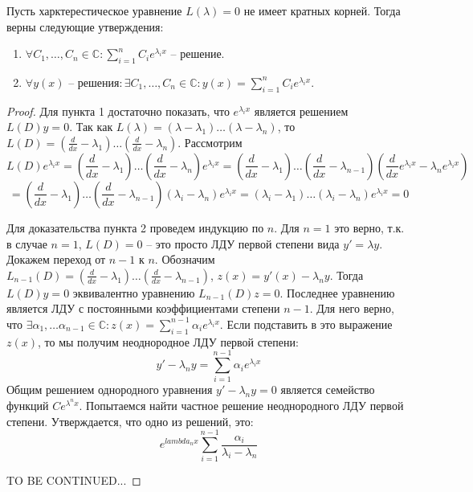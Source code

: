 \documentclass[document.tex]{subfiles}
\begin{document}
\begin{theorem}
Пусть харктерестическое уравнение $L(\lambda) = 0$ не имеет кратных корней. Тогда верны следующие утверждения:
\begin{enumerate}
\item $\forall C_1, \ldots, C_n \in \mathbb{C}: \displaystyle \sum_{i = 1}^n C_i e^{\lambda_i x}$ -- решение.
\item $\forall y(x) \text{ -- решения} : \exists C_1, \ldots, C_n \in \mathbb{C}: y(x) = \displaystyle \sum_{i = 1}^n C_i e^{\lambda_i x}$.
\end{enumerate}
\end{theorem}

\begin{proof}
Для пункта 1 достаточно показать, что $e^{\lambda_i x}$ является решением $L(D)y = 0$. Так как $L(\lambda) = (\lambda - \lambda_1)\ldots(\lambda - \lambda_n)$, то $L(D) = (\frac{d}{dx} - \lambda_1)\ldots(\frac{d}{dx} - \lambda_n)$. Рассмотрим 
$$L(D)e^{\lambda_i x} = (\frac{d}{dx} - \lambda_1)\ldots(\frac{d}{dx} - \lambda_n) e^{\lambda_i x} = (\frac{d}{dx} - \lambda_1)\ldots(\frac{d}{dx} - \lambda_{n-1})(\frac{d}{dx}e^{\lambda_i x} - \lambda_n e^{\lambda_i x})$$
$$ = (\frac{d}{dx} - \lambda_1)\ldots(\frac{d}{dx} - \lambda_{n-1})(\lambda_i - \lambda_n)e^{\lambda_i x} = (\lambda_i - \lambda_1)\ldots(\lambda_i - \lambda_n)e^{\lambda_i x} = 0$$

Для доказательства пункта 2 проведем индукцию по $n$. Для $n = 1$ это верно, т.к. в случае $n = 1$, $L(D) = 0$ -- это просто ЛДУ первой степени вида $y' = \lambda y$. Докажем переход от $n - 1$ к $n$. Обозначим $L_{n-1}(D) = (\frac{d}{dx} - \lambda_1)\ldots(\frac{d}{dx} - \lambda_{n-1})$, $z(x) = y'(x) - \lambda_n y$. Тогда $L(D)y = 0$ эквивалентно уравнению $L_{n-1}(D)z = 0$. Последнее уравнению является ЛДУ с постоянными коэффициентами степени $n-1$. Для него верно, что $\exists \alpha_1, \ldots \alpha_{n-1} \in \mathbb{C}: z(x) = \displaystyle \sum_{i = 1}^{n-1} \alpha_i e^{\lambda_i x}$. Если подставить в это выражение $z(x)$, то мы получим неоднородное ЛДУ первой степени:
$$y' - \lambda_n y = \sum_{i = 1}^{n-1} \alpha_i e^{\lambda_i x}$$
Общим решением однородного уравнения $y' - \lambda_n y = 0$ является семейство функций $Ce^{\lambda^n x}$. Попытаемся найти частное решение неоднородного ЛДУ первой степени. Утверждается, что одно из решений, это:
$$e^{lambda_n x} \sum_{i = 1}^{n - 1} \frac{\alpha_i}{\lambda_i - \lambda_n}$$

TO BE CONTINUED...
\end{proof}
\end{document}
